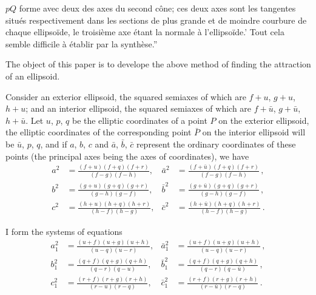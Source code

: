 \documentclass[11pt]{article}
\begin{document}
\smallskip

\noindent $pQ$ forme avec deux des axes du second c\^one; ces deux axes sont les tangentes situ\'es respectivement dans les sections de plus grande et de moindre courbure de chaque ellipso\"ide, le troisi\`eme axe \'etant la normale \`a l'ellipso\"ide.' Tout cela semble difficile \`a \'etablir par la synth\`ese.''

\medskip

The object of this paper is to develope the above method of finding the attraction of an ellipsoid.

\medskip

Consider an exterior ellipsoid, the squared semiaxes of which are $f + u$, $g + u$, $h + u$; and an interior ellipsoid, the squared semiaxes of which are $f + \bar{u}$, $g + \bar{u}$, $h + \bar{u}$. Let $u$, $p$, $q$ be the elliptic coordinates of a point $P$ on the exterior ellipsoid, the elliptic coordinates of the corresponding point $\bar{P}$ on the interior ellipsoid will be $\bar{u}$, $p$, $q$, and if $a$, $b$, $c$ and $\bar{a}$, $\bar{b}$, $\bar{c}$ represent the ordinary coordinates of these points (the principal axes being the axes of coordinates), we have
\[
\begin{aligned}
a^{2} &= \frac{(f + u)(f + q)(f + r)}{(f - g)(f - h)}, & \bar{a}^{2} &= \frac{(f + \bar{u})(f + q)(f + r)}{(f - g)(f - h)}\,,\\[2pt]
b^{2} &= \frac{(g + u)(g + q)(g + r)}{(g - h)(g - f)}, & \bar{b}^{2} &= \frac{(g + \bar{u})(g + q)(g + r)}{(g - h)(g - f)}\,,\\[2pt]
c^{2} &= \frac{(h + u)(h + q)(h + r)}{(h - f)(h - g)}, & \bar{c}^{2} &= \frac{(h + \bar{u})(h + q)(h + r)}{(h - f)(h - g)}\,.
\end{aligned}
\]

I form the systems of equations
\[
\begin{aligned}
a_{1}^{2} &= \frac{(u + f)(u + g)(u + h)}{(u - q)(u - r)}, & \bar{a}_{1}^{2} &= \frac{(u + f)(u + g)(u + h)}{(u - q)(u - r)}\,,\\[2pt]
b_{1}^{2} &= \frac{(q + f)(q + g)(q + h)}{(q - r)(q - u)}, & \bar{b}_{1}^{2} &= \frac{(q + f)(q + g)(q + h)}{(q - r)(q - \bar{u})}\,,\\[2pt]
c_{1}^{2} &= \frac{(r + f)(r + g)(r + h)}{(r - u)(r - q)}, & \bar{c}_{1}^{2} &= \frac{(r + f)(r + g)(r + h)}{(r - \bar{u})(r - q)}\,.
\end{aligned}
\]
\end{document}
